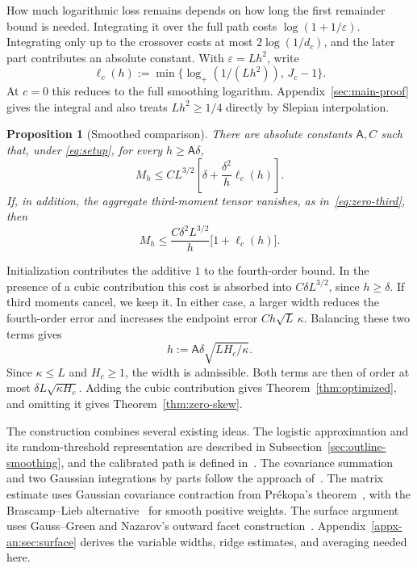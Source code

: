 \documentclass[11pt,letterpaper]{article}
\newtheorem{proposition}{Proposition}
\theoremstyle{remark}
\begin{document}
How much logarithmic loss remains depends on how long the first
remainder bound is needed. Integrating it over the full path costs
\(\log(1+1/\varepsilon)\). Integrating only up to the crossover costs
at most \(2\log(1/d_c)\), and the later part contributes an absolute
constant. With \(\varepsilon=Lh^2\), write
\[
 \ell_c(h):=\min\{\log_+(1/(Lh^2)),\,J_c-1\}.
\]
At \(c=0\) this reduces to the full smoothing logarithm.
Appendix~\ref{sec:main-proof} gives the integral and also treats
\(Lh^2\ge1/4\) directly by Slepian interpolation.

\begin{proposition}[Smoothed comparison]\label{prop:moving-cutoff}
\label{zs:smooth-proposition}
There are absolute constants \(\mathsf A,C\) such that, under
\eqref{eq:setup}, for every \(h\ge\mathsf A\delta\),
\begin{equation}
 M_h\le CL^{3/2}\left[
 \delta+\frac{\delta^2}{h}\ell_c(h)\right].
 \tag{S*}\label{eq:smooth-moving}
\end{equation}
If, in addition, the aggregate third-moment tensor vanishes,
as in~\eqref{eq:zero-third}, then
\begin{equation}
 M_h\le\frac{C\delta^2L^{3/2}}h
 \bigl[1+\ell_c(h)\bigr].
 \label{zs:smooth}
\end{equation}
\end{proposition}

Initialization contributes the additive \(1\) to the fourth-order
bound. In the presence of a cubic contribution this cost is absorbed
into \(C\delta L^{3/2}\), since \(h\ge\delta\). If third moments
cancel, we keep it. In either case, a larger width reduces the
fourth-order error and increases the endpoint error \(Ch\sqrt L\,\kappa\).
Balancing these two terms gives
\begin{equation}
 h:=\mathsf A\delta\sqrt{LH_c/\kappa}.
 \label{eq:optimal-scale}
\end{equation}
Since \(\kappa\le L\) and \(H_c\ge1\), the width is admissible.
Both terms are then of order at most \(\delta L\sqrt{\kappa H_c}\).
Adding the cubic contribution gives Theorem~\ref{thm:optimized},
and omitting it gives Theorem~\ref{thm:zero-skew}.

The construction combines several existing ideas. The logistic
approximation and its random-threshold representation are described
in Subsection~\ref{sec:outline-smoothing}, and the calibrated path
is defined in~\cite[Section~4]{AL}. The covariance summation and two
Gaussian integrations by parts follow the approach
of~\cite[Lemma~23]{GaoZhang}. The matrix estimate uses Gaussian
covariance contraction from Pr\'ekopa's theorem~\cite[Theorem~6]{Prekopa1973},
with the Brascamp--Lieb alternative~\cite{BrascampLieb1976} for smooth
positive weights. The surface argument uses Gauss--Green
\cite[Chapter~5]{EvansGariepy2015} and Nazarov's outward facet
construction~\cite{Nazarov2003,CCK17N}. Appendix~\ref{appx-an:sec:surface}
derives the variable widths, ridge estimates, and averaging needed here.
\label{sec:why-rate}\label{sec:sources}
\end{document}
